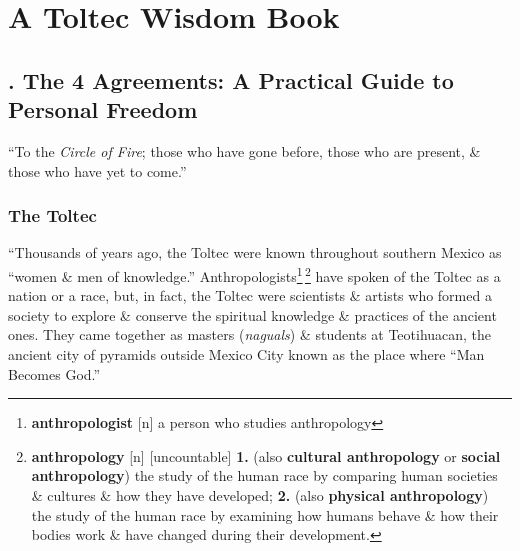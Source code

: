 \documentclass[oneside]{book}
\numberwithin{equation}{section}
\begin{document}
\part{A Toltec Wisdom Book}

\chapter{\cite{Ruiz2011}. The 4 Agreements: A Practical Guide to Personal Freedom}

``To the \textit{Circle of Fire}; those who have gone before, those who are present, \& those who have yet to come.''

\section*{The Toltec}
``Thousands of years ago, the Toltec were known throughout southern Mexico as ``women \& men of knowledge.'' Anthropologists\footnote{\textbf{anthropologist} [n] a person who studies anthropology}\,\footnote{\textbf{anthropology} [n] [uncountable] \textbf{1.} (also \textbf{cultural anthropology} or \textbf{social anthropology}) the study of the human race by comparing human societies \& cultures \& how they have developed; \textbf{2.} (also \textbf{physical anthropology}) the study of the human race by examining how humans behave \& how their bodies work \& have changed during their development.} have spoken of the Toltec as a nation or a race, but, in fact, the Toltec were scientists \& artists who formed a society to explore \& conserve the spiritual knowledge \& practices of the ancient ones. They came together as masters (\textit{naguals}) \& students at Teotihuacan, the ancient city of pyramids outside Mexico City known as the place where ``Man Becomes God.''
\end{document}
